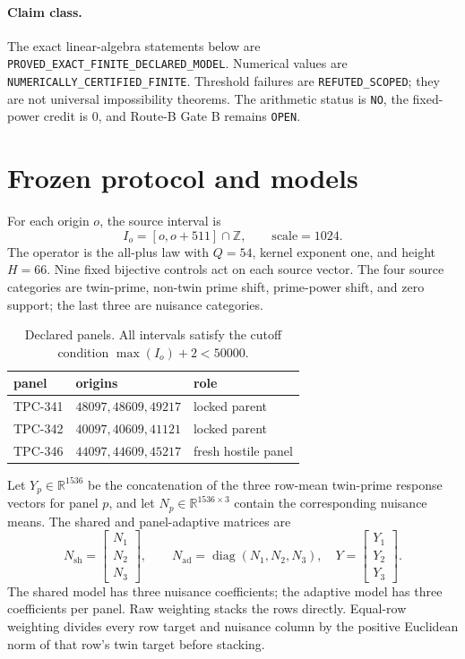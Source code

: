 \documentclass[10pt]{article}
\newcommand{\RR}{\mathbb{R}}
\begin{document}
\paragraph{Claim class.}
The exact linear-algebra statements below are
\texttt{PROVED\_EXACT\_FINITE\_DECLARED\_MODEL}.  Numerical values are
\texttt{NUMERICALLY\_CERTIFIED\_FINITE}.  Threshold failures are
\texttt{REFUTED\_SCOPED}; they are not universal impossibility theorems.
The arithmetic status is \texttt{NO}, the fixed-power credit is $0$, and
Route-B Gate B remains \texttt{OPEN}.

\section{Frozen protocol and models}

For each origin $o$, the source interval is
\[
 I_o=[o,o+511]\cap\mathbb Z,\qquad \text{scale}=1024.
\]
The operator is the all-plus law with $Q=54$, kernel exponent one, and
height $H=66$.  Nine fixed bijective controls act on each source vector.
The four source categories are twin-prime, non-twin prime shift,
prime-power shift, and zero support; the last three are nuisance categories.

\begin{table}[t]
\centering
\small
\caption{Declared panels.  All intervals satisfy the cutoff condition
$\max(I_o)+2<50000$.}
\begin{tabular}{@{}lll@{}}
\toprule
panel & origins & role\\
\midrule
TPC-341 & $48097,48609,49217$ & locked parent\\
TPC-342 & $40097,40609,41121$ & locked parent\\
TPC-346 & $44097,44609,45217$ & fresh hostile panel\\
\bottomrule
\end{tabular}
\end{table}

Let $Y_p\in\RR^{1536}$ be the concatenation of the three row-mean
twin-prime response vectors for panel $p$, and let
$N_p\in\RR^{1536\times 3}$ contain the corresponding nuisance means.
The shared and panel-adaptive matrices are
\[
 N_{\mathrm{sh}}=
 \begin{bmatrix}N_1\\N_2\\N_3\end{bmatrix},
\qquad
 N_{\mathrm{ad}}=\operatorname{diag}(N_1,N_2,N_3),
\quad
 Y=\begin{bmatrix}Y_1\\Y_2\\Y_3\end{bmatrix}.
\]
The shared model has three nuisance coefficients; the adaptive model has
three coefficients per panel.  Raw weighting stacks the rows directly.
Equal-row weighting divides every row target and nuisance column by the
positive Euclidean norm of that row's twin target before stacking.
\end{document}
